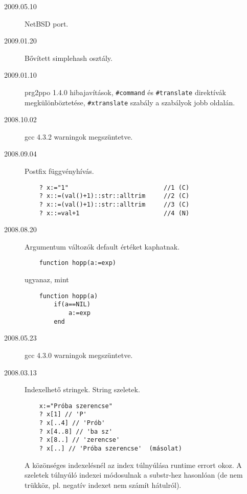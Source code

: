 
\begin{description}

\item[2009.05.10]
  NetBSD port.\par

\item[2009.01.20]
  Bővített simplehash osztály.\par

\item[2009.01.10]
  prg2ppo 1.4.0 
    hibajavítások,
    \verb!#command! és \verb!#translate! direktívák megkülönböztetése,
    \verb!#xtranslate! szabály a szabályok jobb oldalán.\par

\item[2008.10.02]
  gcc 4.3.2 warningok megszüntetve.\par

\item[2008.09.04]
   Postfix függvényhívás.
\begin{verbatim}
    ? x:="1"                          //1 (C)
    ? x::=(val()+1)::str::alltrim     //2 (C)
    ? x::=(val()+1)::str::alltrim     //3 (C)
    ? x::=val+1                       //4 (N)
\end{verbatim}

\item[2008.08.20]
  Argumentum változók default értéket kaphatnak.

\begin{verbatim}
    function hopp(a:=exp)
\end{verbatim}

  ugyanaz, mint  
  
\begin{verbatim}
    function hopp(a)
        if(a==NIL)
            a:=exp
        end
\end{verbatim}


\item[2008.05.23]
  gcc 4.3.0 warningok megszüntetve.\par

\label{20080313}
\item[2008.03.13]
  Indexelhető stringek. String szeletek.
\begin{verbatim}
    x:="Próba szerencse"
    ? x[1] // 'P'
    ? x[..4] // 'Prób'
    ? x[4..8] // 'ba sz'
    ? x[8..] // 'zerencse'
    ? x[..] // 'Próba szerencse'  (másolat)
\end{verbatim}
  A közönséges indexelésnél az index túlnyúlása runtime errort okoz. 
  A szeletek túlnyúló indexei módosulnak a substr-hez hasonlóan
  (de nem trükköz, pl. negatív indexet nem számít hátulról).\par
   


\end{description}
